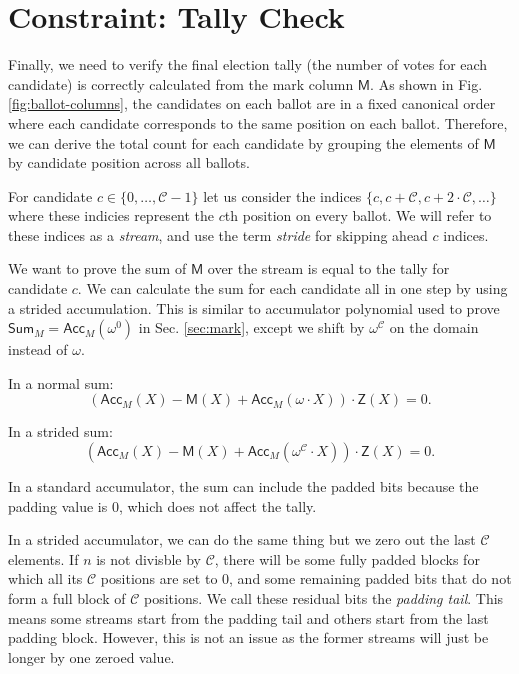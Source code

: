 \section{Constraint: Tally Check}
Finally, we need to verify the final election tally (the number of votes for each candidate) is correctly calculated from the mark column $\mathsf{M}$. As shown in Fig. \ref{fig:ballot-columns}, the candidates on each ballot are in a fixed canonical order where each candidate corresponds to the same position on each ballot. Therefore, we can derive the total count for each candidate by grouping the elements of $\mathsf{M}$ by candidate position across all ballots. 

For candidate $c\in\{0,\dots, \mathcal{C}-1\}$ let us consider the indices $\{c, c + \mathcal{C},  c + 2\cdot \mathcal{C}, \dots \}$ where these indicies represent the $c$th position on every ballot. We will refer to these indices as a \textit{stream}, and use the term \textit{stride} for skipping ahead $c$ indices.

We want to prove the sum of $\mathsf{M}$ over the stream is equal to the tally for candidate $c$. We can calculate the sum for each candidate all in one step by using a strided accumulation. This is similar to accumulator polynomial used to prove $\mathsf{Sum}_M = \mathsf{Acc}_M(\omega^0)$ in Sec. \ref{sec:mark}, except we shift by $\omega^\mathcal{C}$ on the domain instead of $\omega$.

In a normal sum:
\[
(\mathsf{Acc}_M(X)-\mathsf{M}(X)+\mathsf{Acc}_M(\omega\cdot X))\cdot \mathsf{Z}(X)=0.
\]

In a strided sum: 
\[
(\mathsf{Acc}_M(X)-\mathsf{M}(X)+\mathsf{Acc}_M(\omega^\mathcal{C}\cdot X))\cdot \mathsf{Z}(X) = 0.
\]

In a standard accumulator, the sum can include the padded bits because the padding value is 0, which does not affect the tally.

  In a strided accumulator, we can do the same thing but we zero out the last $\mathcal{C}$ elements.
  If $n$ is not divisble by $\mathcal{C}$, there will be some fully padded blocks for which all its $\mathcal{C}$ positions are set to 0, and some remaining padded bits that do not form a full block of $\mathcal{C}$ positions. We call these residual bits the \textit{padding tail}.
  This means some streams start from the padding tail and others start from the last padding block. However, this is not an issue as the former streams will just be longer by one zeroed value.

